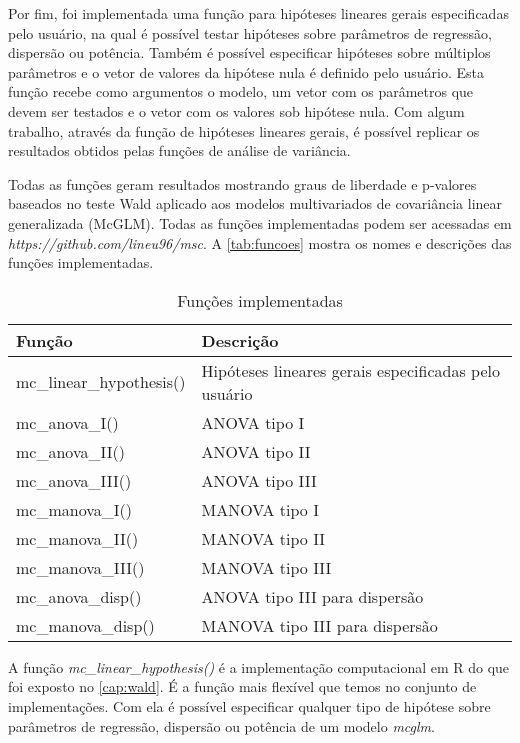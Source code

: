 Por fim, foi implementada uma função para hipóteses lineares gerais especificadas pelo usuário, na qual é possível testar hipóteses sobre parâmetros de regressão, dispersão ou potência. Também é possível especificar hipóteses sobre múltiplos parâmetros e o vetor de valores da hipótese nula é definido pelo usuário. Esta função recebe como argumentos o modelo, um vetor com os parâmetros que devem ser testados e o vetor com os valores sob hipótese nula. Com algum trabalho, através da função de hipóteses lineares gerais, é possível replicar os resultados obtidos pelas funções de análise de variância.

Todas as funções geram resultados mostrando graus de liberdade e p-valores baseados no teste Wald aplicado aos modelos multivariados de covariância linear generalizada (McGLM). Todas as funções implementadas podem ser acessadas em \emph{https://github.com/lineu96/msc}. A \autoref{tab:funcoes} mostra os nomes e descrições das funções implementadas.

\begin{table}[h]
\centering
\begin{tabular}{ll}
\hline
Função                   & Descrição \\ 
\hline

mc\_linear\_hypothesis() & Hipóteses lineares gerais especificadas pelo usuário \\

mc\_anova\_I()           & ANOVA  tipo I \\
mc\_anova\_II()          & ANOVA  tipo II \\
mc\_anova\_III()         & ANOVA  tipo III \\

mc\_manova\_I()          & MANOVA tipo I \\
mc\_manova\_II()         & MANOVA tipo II \\
mc\_manova\_III()        & MANOVA tipo III \\

mc\_anova\_disp()        & ANOVA  tipo III para dispersão \\
mc\_manova\_disp()       & MANOVA tipo III para dispersão \\

\hline
\end{tabular}
\caption{Funções implementadas}
\label{tab:funcoes}
\end{table}

A função \emph{mc\_linear\_hypothesis()} é a implementação computacional em R do que foi exposto no \autoref{cap:wald}. É a função mais flexível que temos no conjunto de implementações. Com ela é possível especificar qualquer tipo de hipótese sobre parâmetros de regressão, dispersão ou potência de um modelo \emph{mcglm}. 


